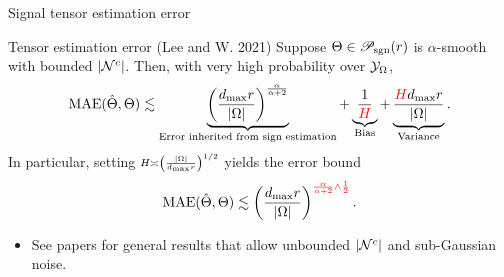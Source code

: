 \documentclass[10pt, mathserif]{beamer} %
\theoremstyle{definition}
\theoremstyle{plain}
\def\caliP{\mathscr{P}_{\textup{sgn}}}
\newcommand*{\KeepStyleUnderBrace}[1]{%
\mathop{%
\mathchoice
{\underbrace{\displaystyle#1}}%
{\underbrace{\textstyle#1}}%
{\underbrace{\scriptstyle#1}}%
{\underbrace{\scriptscriptstyle#1}}%
}\limits
}
\def\caliP{\mathscr{P}_{\textup{sgn}}}
\begin{document}
\begin{frame}[label=bound]{Signal tensor estimation error}
    \begin{block}{Tensor estimation error (Lee and W. 2021)}
    Suppose $\Theta\in\caliP(r)$ is $\alpha$-smooth with bounded $|\mathcal{N}^c|$. Then, with very high probability over $\mathcal{Y}_\Omega$, 
    \vspace{-0.3cm}
    \begin{equation}\label{eq:bound2}
\textup{MAE}(\hat \Theta, \Theta)\lesssim \KeepStyleUnderBrace{\left({d_{\max} r \over |\Omega|}\right)^{\alpha\over\alpha+2}}_{\text{Error inherited from sign estimation}}+\KeepStyleUnderBrace{{1\over \color{red}H}}_{\text{Bias}}+\KeepStyleUnderBrace{{{\color{red}H}d_{\max} r \over |\Omega|}}_{\text{Variance}}.
\end{equation}
In particular, setting $\scriptstyle H\asymp \left( |\Omega|\over d_{\max}r\right)^{1/2}$ yields the error bound
\begin{equation}\label{eq:real}
\textup{MAE}(\hat \Theta, \Theta)\lesssim \left(d_{\max}r \over |\Omega|\right)^{\color{red}{\alpha \over  \alpha+2}\wedge {1\over 2}}.
\end{equation}
    \end{block}
    \begin{itemize}
    \item See papers for general results that allow unbounded $|\mathcal{N}^c|$ and sub-Gaussian noise. 

    \end{itemize}
    \vspace{-.5cm}
\hfill \hyperlink{extension}{}
    
\end{frame}
\end{document}
